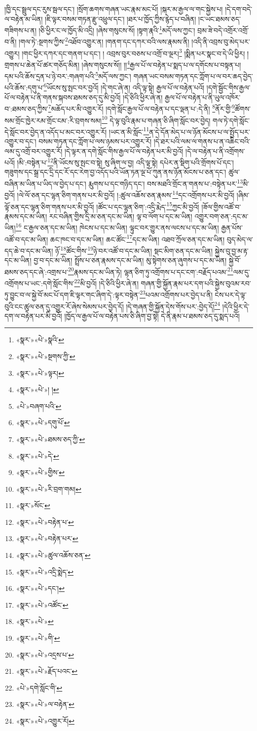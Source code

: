 །ཁྱི་དང་སྦྲུལ་དང་རུས་སྦལ་དང་། །སྲོག་ཆགས་གཞན་ཡང་རྣམ་མང་པོ། །སྐར་མ་རྒྱལ་ལ་གང་སྐྱེས་པ། །དེ་དག་བདེ་ལ་བརྟེན་མ་ཡིན། །ཇི་ལྟར་བསམ་གཏན་རྫུ་འཕྲུལ་དང་། །ཐར་པ་ཁྱོད་ཀྱིས་རྙེད་པ་བཞིན། །ང་ཡང་ཐམས་ཅད་གཟིགས་པ་ན། །ཅི་ཕྱིར་ང་ལ་ཁྱོད་མི་འདྲི། །ཞེས་གསུངས་སོ། །སྟག་རྣའི་\footnote{«སྣར་»«པེ་»སྣའི་}མདོ་ལས་ཀྱང་། བྲམ་ཟེ་བདེ་འགྲོར་འགྲོ་བ་ནི། །གལ་ཏེ་:སྔགས་ཀྱིས་\footnote{«སྣར་»«པེ་»སྔགས་ཀྱི་}འཐོབ་འགྱུར་ན། །གནག་དང་དཀར་བའི་ལས་རྣམས་ནི། །འདི་ནི་འབྲས་བུ་མེད་པར་འགྱུར། །གང་ཕྱིར་དཀར་དང་གནག་པ་དང་། །
འབྲས་བུར་བཅས་པ་འགྲོ་བ་ལྔར།\footnote{«སྣར་»«པེ་»ལྟར།} །སྨིན་པར་སྣང་བ་དེ་ཡི་ཕྱིར། །གྲགས་པ་ཆེན་པོ་ཚར་གཅོད་མིན། །ཞེས་གསུངས་སོ།། །།\footnote{«སྣར་»«པེ་»། །}རྒྱལ་པོ་ལ་བརྟེན་པ་སྨད་པ་ལ་དགོངས་པ་བསྟན་པ། དམ་པའི་ཆོས་དྲན་པ་ཉེ་བར་:གཞག་པའི་\footnote{«པེ་»བཞག་པའི་}མདོ་ལས་ཀྱང་། གཞན་ཡང་བསམ་གཏན་དང་ཀློག་པ་ལ་བར་ཆད་བྱེད་པའི་ཆོས་:དགུ་པ་\footnote{«སྣར་»«པེ་»དགུ་པོ་}ཡོངས་སུ་སྤང་བར་བྱའོ། །དེ་གང་ཞེ་ན། འདི་ལྟ་སྟེ། རྒྱལ་པོ་ལ་བརྟེན་པའོ། །དགེ་སྦྱོང་གིས་རྒྱལ་པོ་ལ་བརྟེན་པ་ནི་གནས་སྐབས་ཐམས་ཅད་དུ་མི་བྱའོ། །དེ་ཅིའི་ཕྱིར་ཞེ་ན། རྒྱལ་པོ་ལ་བརྟེན་པ་ནི་ཡུལ་འཁོར་བ་:ཐམས་ཅད་ཀྱིས་\footnote{«སྣར་»«པེ་»ཐམས་ཅད་ཀྱི་}མཆོད་པར་མི་འགྱུར་རོ། །དགེ་སློང་རྒྱལ་པོ་ལ་བརྟེན་པ་དང་ལྡན་པ་:དེ་ནི། \footnote{«སྣར་»«པེ་»དེ་}ནོར་གྱི་\footnote{«སྣར་»«པེ་»གྱིས་}ཚོགས་སམ་གྲོང་ཁྱེར་རམ་གྲོང་ངམ་:རི་བྲགས་སམ།\footnote{«སྣར་»«པེ་»རི་བྲག་གམ།} དེ་ལྟ་བུའི་རྣམ་པ་གཞན་ཅི་ཞིག་སློང་བར་བྱེད། གལ་ཏེ་དགེ་སློང་དེ་སློང་བར་བྱེད་ན་འདོད་པ་མང་བར་འགྱུར་རོ། །ཡང་ན་མི་སློང་\footnote{«སྣར་»སོང་}ན་དེ་དོན་མེད་པ་ལ་ཉོན་མོངས་པ་ལ་སྤྱོད་པར་འགྱུར་བ་དང་། བསམ་གཏན་དང་ཀློག་པ་ལས་ཉམས་པར་འགྱུར་རོ། །དེ་ཐར་པའི་ལམ་ལ་གནས་པ་ན་འཆིང་བའི་ལམ་དུ་འགྲོ་བར་འགྱུར་རོ། །དེ་ལྟར་ན་དགེ་སློང་གིས་རྒྱལ་པོ་ལ་བརྟེན་པར་མི་བྱའོ། །དེ་ལ་བརྟེན་པ་ནི་འགྲོགས་པའོ། །མི་:བསྟེན་པ་\footnote{«སྣར་»«པེ་»བརྟེན་པ་}ནི་ཡོངས་སུ་སྤང་བ་སྟེ། སུ་ཞིག་ལ་བྱ། འདི་ལྟ་སྟེ། དཔེར་ན་སྡིག་པའི་གྲོགས་པོ་དང་། གཟུགས་དང་སྒྲ་དང་དྲི་དང་རོ་དང་རེག་བྱ་འདོད་པའི་ཡོན་ཏན་ལྔ་པོ་ཀུན་ནས་ཉོན་མོངས་པ་ཅན་དང་། ཚུལ་བཞིན་མ་ཡིན་པ་ཡིད་ལ་བྱེད་པ་དང་། རྨུགས་པ་དང་གཉིད་དང་། བས་མཐའི་གྲོང་ན་གནས་པ་:བསྟེན་པར་\footnote{«སྣར་»«པེ་»བརྟེན་པར་}མི་བྱའོ། །ལེ་ལོ་ཅན་དང་ལྷན་ཅིག་གནས་པར་མི་བྱའོ། །:ཚུལ་འཆོས་ཅན་རྣམས་\footnote{«སྣར་»«པེ་»ཚུལ་འཆོས་ཅན་}དང་འགྲོགས་པར་མི་བྱའོ། །ཞིམ་ལྟོ་ཅན་དང་ལྷན་ཅིག་གནས་པར་མི་བྱའོ། །ཚོང་པ་དང་ལྷན་ཅིག་:འདྲི་རྨེད་\footnote{«སྣར་»«པེ་»འདྲི་སྨེད་}ཀྱང་མི་བྱའོ། །ཟོལ་གྱིས་འཚོ་བ་རྣམས་དང་མ་ཡིན། རང་བཞིན་གྱིས་དྲི་མ་ཅན་དང་མ་ཡིན། ལྟ་བ་ལོག་པ་དང་མ་ཡིན། འགྱུར་བག་ཅན་:དང་མ་ཡིན།\footnote{«སྣར་»«པེ་»དང་།} ང་རྒྱལ་ཅན་དང་མ་ཡིན། ཁེངས་པ་དང་མ་ཡིན། ལྟུང་བར་གྱུར་ནས་ལངས་པ་དང་མ་ཡིན། རྒྱན་པོས་འཚོ་བ་དང་མ་ཡིན། ཆང་ཁང་བ་དང་མ་ཡིན། ཆང་ཚོང་\footnote{«སྣར་»«པེ་»འཚོང་}དང་མ་ཡིན། འཐབ་ཀྲོལ་ཅན་དང་མ་ཡིན། བུད་མེད་ལ་དད་ཆེ་བ་དང་མ་ཡིན། ཉོ་\footnote{«སྣར་»«པེ་»}ཚོང་གིས་\footnote{«སྣར་»«པེ་»གི་}ཉེ་བར་འཚོ་བ་དང་མ་ཡིན། སྡང་མིག་ཅན་དང་མ་ཡིན། སྐྱེས་བུ་བྱ་མ་རྟ་དང་མ་ཡིན། བྱ་བ་དང་མ་ཡིན། སྤྲོས་པ་ཅན་རྣམས་དང་མ་ཡིན། མུ་སྟེགས་ཅན་ཞུགས་པ་དང་མ་ཡིན། སྐྱེ་བོ་ཐམས་ཅད་དང་ཞེ་:འགྲས་པ་\footnote{«སྣར་»«པེ་»འདྲས་པ་}རྣམས་དང་མ་ཡིན་ཏེ། ལྷན་ཅིག་ཏུ་འགྲོགས་པ་དང་ངག་:བརྗོད་པའམ་\footnote{«སྣར་»«པེ་»རྗོད་པའང་}ལམ་དུ་འགྲོགས་པ་ཡང་:དགེ་སློང་གིས་\footnote{«པེ་»དགེ་སློང་གི་}མི་བྱའོ། །དེ་ཅིའི་ཕྱིར་ཞེ་ན། གཞན་གྱི་སྐྱོན་རྣམ་པར་དག་པའི་སྐྱེས་བུའམ་རབ་ཏུ་བྱུང་བ་ལ་སྐྱེ་བོ་མང་པོ་དག་ཇི་ལྟར་གང་ཞིག་དེ་:ལྟར་བསྟེན་\footnote{«སྣར་»«པེ་»ལ་བརྟེན་}པའམ་འགྲོགས་པར་བྱེད་པ་ནི། ངེས་པར་དེ་ལྟ་བུའི་ངང་ཚུལ་ཅན་དུ་འགྱུར་རོ་ཞེས་སེམས་པར་བྱེད་དོ། །དེ་གཞན་གྱི་སྐྱོན་དེས་གོས་པར་:བྱེད་དོ།\footnote{«སྣར་»«པེ་»འགྱུར་རོ།} །དེའི་ཕྱིར་དེ་དག་ལ་བརྟེན་པར་མི་བྱའོ། །ཁྱོད་ལ་རྒྱལ་པོ་ལ་བརྟེན་པས་ཅི་ཞིག་བྱ་སྟེ། དེ་ནི་རྣམ་པ་ཐམས་ཅད་དུ་སྨད་པའོ། 